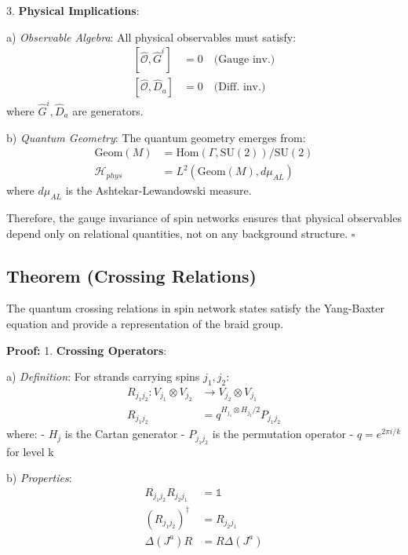 \documentclass[12pt,a4paper]{article}
\begin{document}
3. \textbf{Physical Implications}:
   
   a) \textit{Observable Algebra}:
      All physical observables must satisfy:
      \[
      \begin{aligned}
      [\hat{\mathcal{O}}, \hat{G}^i] &= 0 \quad \text{(Gauge inv.)} \\
      [\hat{\mathcal{O}}, \hat{D}_a] &= 0 \quad \text{(Diff. inv.)}
      \end{aligned}
      \]
      where $\hat{G}^i, \hat{D}_a$ are generators.
   
   b) \textit{Quantum Geometry}:
      The quantum geometry emerges from:
      \[
      \begin{aligned}
      \text{Geom}(M) &= \text{Hom}(\Gamma, \text{SU}(2))/\text{SU}(2) \\
      \mathcal{H}_{phys} &= L^2(\text{Geom}(M), d\mu_{AL})
      \end{aligned}
      \]
      where $d\mu_{AL}$ is the Ashtekar-Lewandowski measure.

Therefore, the gauge invariance of spin networks ensures that physical observables depend only on relational quantities, not on any background structure. $\square$

\subsection{Theorem (Crossing Relations)}
The quantum crossing relations in spin network states satisfy the Yang-Baxter equation and provide a representation of the braid group.

\textbf{Proof:}
1. \textbf{Crossing Operators}:
   
   a) \textit{Definition}:
      For strands carrying spins $j_1, j_2$:
      \[
      \begin{aligned}
      R_{j_1j_2}: V_{j_1} \otimes V_{j_2} &\rightarrow V_{j_2} \otimes V_{j_1} \\
      R_{j_1j_2} &= q^{H_{j_1} \otimes H_{j_2}/2}P_{j_1j_2}
      \end{aligned}
      \]
      where:
      - $H_j$ is the Cartan generator
      - $P_{j_1j_2}$ is the permutation operator
      - $q = e^{2\pi i/k}$ for level k
   
   b) \textit{Properties}:
      \[
      \begin{aligned}
      R_{j_1j_2}R_{j_2j_1} &= \mathbb{1} \\
      (R_{j_1j_2})^\dagger &= R_{j_2j_1} \\
      \Delta(J^a) R &= R \Delta(J^a)
      \end{aligned}
      \]
\end{document}
